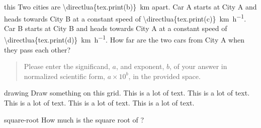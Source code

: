 \documentclass[
    11pt,
]{scrartcl}
\begin{document}
\begin{examcopy}[1]
\begin{multicols}{2}

    \begin{questionmultx}{this}
        Two cities are \SI{\directlua{tex.print(b)}}{\kilo\meter} apart.
        Car A starts at City A and heads towards City B at a constant
            speed of \SI{\directlua{tex.print(c)}}{\kilo\meter\per\hour}.
        Car B starts at City B and heads towards City A at a constant
            speed of \SI{\directlua{tex.print(d)}}{\kilo\meter\per\hour}.
        How far are the two cars from City A when they pass each other?

        \begin{quote}
        Please enter the significand, $a$, and exponent, $b$,
            of your answer in normalized scientific form,
            $a \times 10^b$, in the provided space.
        \end{quote}

    \end{questionmultx}

    \newcommand\onegrid{
        \begin{tikzpicture}
            \draw[step=0.5cm] (0,0) grid (8,8);
        \end{tikzpicture}
    }
    \begin{questionmultx}{drawing}
       Draw something on this grid.
       This is a lot of text.
       This is a lot of text.
       This is a lot of text.
       This is a lot of text.
       This is a lot of text.
    \end{questionmultx}


    \begin{question}{square-root}
      How much is the square root of ?
      \begin{choices}
      \end{choices}
    \end{question}


\end{multicols}
\end{examcopy}
\end{document}
